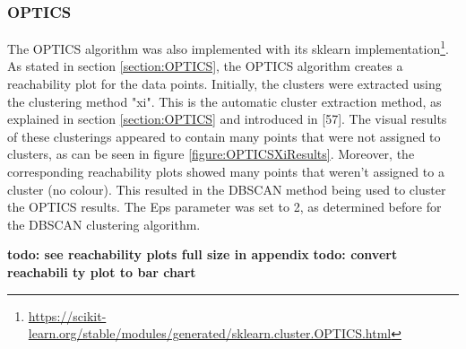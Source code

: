 \subsubsection{OPTICS}
The OPTICS algorithm was also implemented with its sklearn implementation\footnote{\url{https://scikit-learn.org/stable/modules/generated/sklearn.cluster.OPTICS.html}}. As stated in section \ref{section:OPTICS}, the OPTICS algorithm creates a reachability plot for the data points. Initially, the clusters were extracted using the clustering method "xi". This is the automatic cluster extraction method, as explained in section \ref{section:OPTICS} and introduced in \textcite{OPTICS}[57]. The visual results of these clusterings appeared to contain many points that were not assigned to clusters, as can be seen in figure \ref{figure:OPTICSXiResults}. Moreover, the corresponding reachability plots showed many points that weren't assigned to a cluster (no colour). This resulted in the DBSCAN method being used to cluster the OPTICS results. The Eps parameter was set to 2, as determined before for the DBSCAN clustering algorithm.

\textbf{todo: see reachability plots full size in appendix}
\textbf{todo: convert reachabili
ty plot to bar chart}


